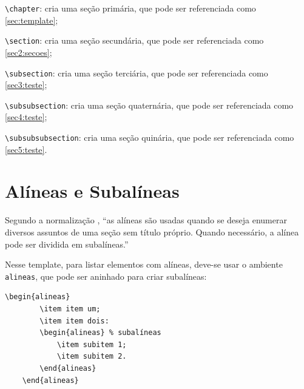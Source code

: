 \begin{alineas}
	\item \verb|\chapter|:  cria uma seção primária, que pode ser referenciada como \autoref{sec:template};
	\item \verb|\section|:  cria uma seção secundária, que pode ser referenciada como \autoref{sec2:secoes};
	\item \verb|\subsection|:  cria uma seção terciária, que pode ser referenciada como \autoref{sec3:teste};
	\item \verb|\subsubsection|:  cria uma seção quaternária, que pode ser referenciada como \autoref{sec4:teste};
	\item \verb|\subsubsubsection|:  cria uma seção quinária, que pode ser referenciada como \autoref{sec5:teste}.
\end{alineas}


\section{Alíneas e Subalíneas}
Segundo a normalização \cite{UFLA:2025}, ``as alíneas são usadas quando se deseja enumerar diversos assuntos de uma seção sem título próprio. Quando necessário, a alínea pode ser dividida em subalíneas.''

Nesse template, para listar elementos com alíneas, deve-se usar o ambiente \texttt{alineas}, que pode ser aninhado para criar subalíneas: 
\begin{lstlisting}[language={[LaTeX]TeX}]
	\begin{alineas}
		\item item um;
		\item item dois:
		\begin{alineas} % subalíneas
			\item subitem 1;
			\item subitem 2.
		\end{alineas}
	\end{alineas}
\end{lstlisting}
\vspace{18pt}

